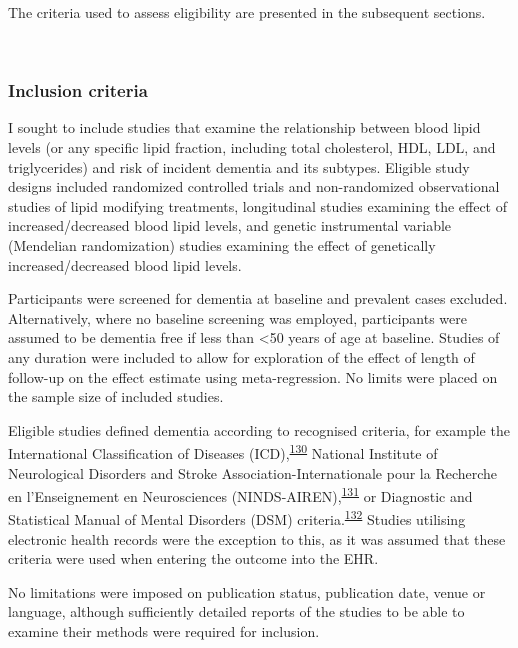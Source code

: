 \documentclass[a4paper, twoside]{templates/ociamthesis}
\begin{document}
The criteria used to assess eligibility are presented in the subsequent sections.

~

\hypertarget{inclusion-criteria}{%
\subsubsection{Inclusion criteria}\label{inclusion-criteria}}

I sought to include studies that examine the relationship between blood lipid levels (or any specific lipid fraction, including total cholesterol, HDL, LDL, and triglycerides) and risk of incident dementia and its subtypes. Eligible study designs included randomized controlled trials and non-randomized observational studies of lipid modifying treatments, longitudinal studies examining the effect of increased/decreased blood lipid levels, and genetic instrumental variable (Mendelian randomization) studies examining the effect of genetically increased/decreased blood lipid levels.

Participants were screened for dementia at baseline and prevalent cases excluded. Alternatively, where no baseline screening was employed, participants were assumed to be dementia free if less than \textless50 years of age at baseline. Studies of any duration were included to allow for exploration of the effect of length of follow-up on the effect estimate using meta-regression. No limits were placed on the sample size of included studies.

Eligible studies defined dementia according to recognised criteria, for example the International Classification of Diseases (ICD),\textsuperscript{\protect\hyperlink{ref-organizationwho1993}{130}} National Institute of Neurological Disorders and Stroke Association-Internationale pour la Recherche en l'Enseignement en Neurosciences (NINDS-AIREN),\textsuperscript{\protect\hyperlink{ref-roman1993}{131}} or Diagnostic and Statistical Manual of Mental Disorders (DSM) criteria.\textsuperscript{\protect\hyperlink{ref-edition2013}{132}} Studies utilising electronic health records were the exception to this, as it was assumed that these criteria were used when entering the outcome into the EHR.

No limitations were imposed on publication status, publication date, venue or language, although sufficiently detailed reports of the studies to be able to examine their methods were required for inclusion.

~
\end{document}
